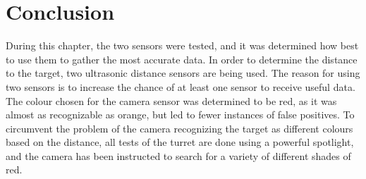 \section{Conclusion}
During this chapter, the two sensors were tested, and it was determined how best
to use them to gather the most accurate data. In order to determine the distance
to the target, two ultrasonic distance sensors are being used. The reason for
using two sensors is to increase the chance of at least one sensor to receive
useful data. The colour chosen for the camera sensor was determined to be red,
as it was almost as recognizable as orange, but led to fewer instances of
false positives. To circumvent the problem of the camera recognizing the
target as different colours based on the distance, all tests of the turret are
done using a powerful spotlight, and the camera has been instructed to search
for a variety of different shades of red.
